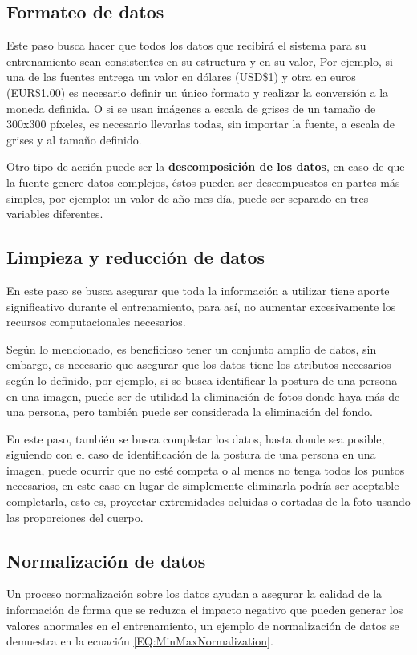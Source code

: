     \subsection{Formateo de datos}
        Este paso busca hacer que todos los datos que recibirá el sistema para su entrenamiento sean consistentes en su estructura y en su valor, Por ejemplo, si una de las fuentes entrega un valor en dólares (USD\$1) y otra en euros (EUR\$1.00) es necesario definir un único formato y realizar la conversión a la moneda definida. O si se usan imágenes a escala de grises de un tamaño de 300x300 píxeles, es necesario llevarlas todas, sin importar la fuente, a escala de grises y al tamaño definido.
        
        Otro tipo de acción puede ser la \textbf{descomposición de los datos}, en caso de que la fuente genere datos complejos, éstos pueden ser descompuestos en partes más simples, por ejemplo: un valor de año mes día, puede ser separado en tres variables diferentes.
        
    \subsection{Limpieza y reducción de datos}
        En este paso se busca asegurar que toda la información a utilizar tiene aporte significativo durante el entrenamiento, para así, no aumentar excesivamente los recursos computacionales necesarios.
        
        Según lo mencionado, es beneficioso tener un conjunto amplio de datos, sin embargo, es necesario que asegurar que los datos tiene los atributos necesarios según lo definido, por ejemplo, si se busca identificar la postura de una persona en una imagen, puede ser de utilidad la eliminación de fotos donde haya más de una persona, pero también puede ser considerada la eliminación del fondo.
        
        En este paso, también se busca completar los datos, hasta donde sea posible, siguiendo con el caso de identificación de la postura de una persona en una imagen, puede ocurrir que no esté competa o al menos no tenga todos los puntos necesarios, en este caso en lugar de simplemente eliminarla podría ser aceptable completarla, esto es, proyectar extremidades ocluidas o cortadas de la foto usando las proporciones del cuerpo.
        
    \subsection{Normalización de datos}
        Un proceso normalización sobre los datos ayudan a asegurar la calidad de la información de forma que se reduzca el impacto negativo que pueden generar los valores anormales en el entrenamiento, un ejemplo de normalización de datos se demuestra en la ecuación \ref{EQ:MinMaxNormalization}.
        
